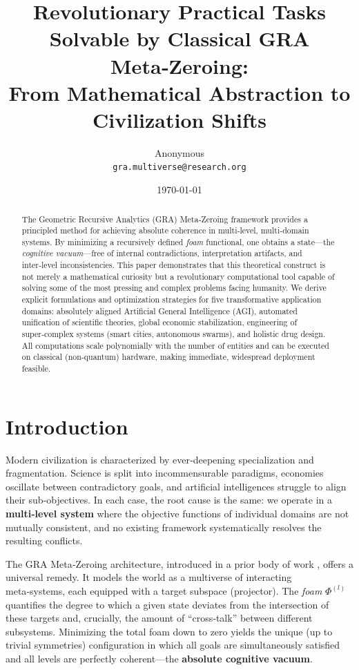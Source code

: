 \documentclass[11pt,a4paper]{article}
\title{\bfseries Revolutionary Practical Tasks Solvable by Classical GRA Meta‑Zeroing:\\[4pt]
From Mathematical Abstraction to Civilization Shifts}
\author{Anonymous\\
\texttt{gra.multiverse@research.org}}
\date{\today}
\theoremstyle{definition}
\newcommand{\Foam}{\Phi}
\begin{document}
\maketitle

\begin{abstract}
The Geometric Recursive Analytics (GRA) Meta‑Zeroing framework provides a principled method for achieving absolute coherence in multi‑level, multi‑domain systems. By minimizing a recursively defined \emph{foam} functional, one obtains a state---the \emph{cognitive vacuum}---free of internal contradictions, interpretation artifacts, and inter‑level inconsistencies. 
This paper demonstrates that this theoretical construct is not merely a mathematical curiosity but a revolutionary computational tool capable of solving some of the most pressing and complex problems facing humanity.
We derive explicit formulations and optimization strategies for five transformative application domains: absolutely aligned Artificial General Intelligence (AGI), automated unification of scientific theories, global economic stabilization, engineering of super‑complex systems (smart cities, autonomous swarms), and holistic drug design.
All computations scale polynomially with the number of entities and can be executed on classical (non‑quantum) hardware, making immediate, widespread deployment feasible.
\end{abstract}

\section{Introduction}

Modern civilization is characterized by ever‑deepening specialization and fragmentation. Science is split into incommensurable paradigms, economies oscillate between contradictory goals, and artificial intelligences struggle to align their sub‑objectives. In each case, the root cause is the same: we operate in a \textbf{multi‑level system} where the objective functions of individual domains are not mutually consistent, and no existing framework systematically resolves the resulting conflicts.

The GRA Meta‑Zeroing architecture, introduced in a prior body of work \cite{gra-orig}, offers a universal remedy. It models the world as a multiverse of interacting meta‑systems, each equipped with a target subspace (projector). The \emph{foam} $\Foam^{(l)}$ quantifies the degree to which a given state deviates from the intersection of these targets and, crucially, the amount of ``cross‑talk'' between different subsystems. Minimizing the total foam down to zero yields the unique (up to trivial symmetries) configuration in which all goals are simultaneously satisfied and all levels are perfectly coherent---the \textbf{absolute cognitive vacuum}.
\end{document}
